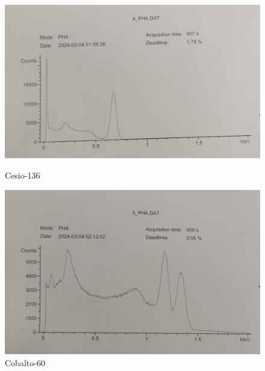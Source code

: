 \documentclass[a4paper,12pt,spanish]{article}
\begin{document}
	\begin{figure}[H]
		
		\centering
		\begin{minipage}{0.45\textwidth}
			\centering
			\includegraphics[width=1.1\linewidth]{../graficas_procesadas/PHA_4}
			\caption{Cesio-136}
			\label{fig:pha4}
		\end{minipage}\hfill
		\begin{minipage}{0.45\textwidth}
			\centering
			\includegraphics[width=1.1
			\linewidth]{../graficas_procesadas/PHA_5}
			\caption{Cobalto-60}
			\label{fig:pha5}
		\end{minipage}
		

\end{figure}
\end{document}
